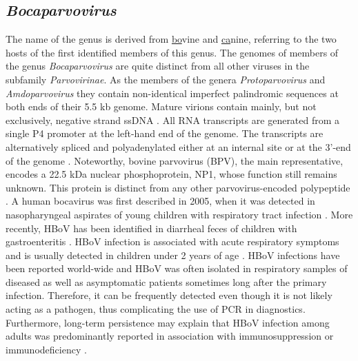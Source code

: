 \subsection{\textit{Bocaparvovirus}}
The name of the genus is derived from \underline{bo}vine and \underline{ca}nine, referring to the two hosts of the first identified members of this genus.  The genomes of members of the genus \textit{Bocaparvovirus} are quite distinct from all other viruses in the subfamily \textit{Parvovirinae}. As the members of the genera \textit{Protoparvovirus} and \textit{Amdoparvovirus} they contain non-identical imperfect palindromic sequences at both ends of their 5.5 kb genome. Mature virions contain mainly, but not exclusively, negative strand ssDNA \cite{pmid3783814,pmid12441065}.
All RNA transcripts are generated from a single P4 promoter at the left-hand end of the genome. The transcripts are alternatively spliced and polyadenylated either at an internal site or at the 3’-end of the genome \cite{pmid17715221}. Noteworthy, bovine parvovirus (BPV), the main representative, encodes a 22.5 kDa nuclear phosphoprotein, NP1, whose function still remains unknown. This protein is distinct from any other parvovirus-encoded polypeptide \cite{pmid6319731}.
A human bocavirus was first described in 2005, when it was detected in nasopharyngeal aspirates of young children with respiratory tract infection \cite{pmid11562506, pmid16118271}. More recently, HBoV has been identified in diarrheal feces of children with gastroenteritis \cite{pmid17553287}. HBoV infection is associated with acute respiratory symptoms and is usually detected in children under 2 years of age \cite{pmid17122013, pmid16517912, pmid17041855}. HBoV infections have been reported world-wide and HBoV was often isolated in respiratory samples of diseased as well as asymptomatic patients sometimes long after the primary infection. Therefore, it can be frequently detected even though it is not likely acting as a pathogen, thus complicating the use of PCR in diagnostics. Furthermore, long-term persistence may explain that HBoV infection among adults was predominantly reported in association with immunosuppression or immunodeficiency \cite{pmid17041855, pmid17176591}.         





